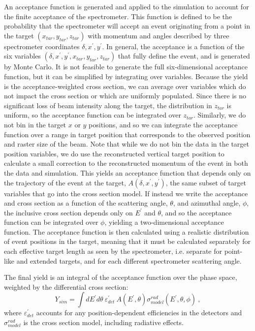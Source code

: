 An acceptance function is generated and applied to the simulation to account
for the finite acceptance of the spectrometer. This function is
defined to be the probability that the spectrometer will accept an event
originating from a point in the target $(x_{tar},y_{tar}, z_{tar})$ with
momentum and angles described by three spectrometer coordinates $\delta,x^{'},
y^{'}$. In general, the acceptance is a function of the six variables
$(\delta, x^{'}, y^{'}, x_{tar}, y_{tar}, z_{tar})$ that fully define the
event, and is generated by Monte Carlo. It is not feasible to generate the
full six-dimensional acceptance function, but it can be simplified by
integrating over variables.  Because the yield is the acceptance-weighted
cross section, we can average over variables which do not impact the cross
section or which are uniformly populated. Since there is no significant loss
of beam intensity along the target, the distribution in $z_{tar}$ is uniform,
so the acceptance function can be integrated over $z_{tar}$. Similarly, we do
not bin in the target $x$ or $y$ positions, and so we can integrate the
acceptance function over a range in target position that corresponds to the
observed position and raster size of the beam. Note that while we do not bin
the data in the target position variables, we do use the reconstructed
vertical target position to calculate a small correction to the reconstructed
momentum of the event in both the data and simulation. This yields an
acceptance function that depends only on the trajectory of the event at the
target, $A(\delta, x^\prime, y^\prime)$, the same subset of target variables
that go into the cross section model. If instead we write the acceptance and
cross section as a function of the scattering angle, $\theta$, and azimuthal
angle, $\phi$, the inclusive cross section depends only on $E^\prime$ and
$\theta$, and so the acceptance function can be integrated over $\phi$,
yielding a two-dimensional acceptance function. The acceptance function is
then calculated using a realistic distribution of event positions in the
target, meaning that it must be calculated separately for each effective
target length as seen by the spectrometer, i.e. separate for point-like and
extended targets, and for each different spectrometer scattering angle.


The final yield is an integral of the acceptance function over the
phase space, weighted by the differential cross section:
%
%
\begin{equation}
 Y_{sim} = \int dE^{\prime} d\theta ~ \varepsilon^{\prime}_{det} ~
 A(E^{\prime},\theta) {}\sigma^{rad}_{model}(E^{\prime},\theta,\phi) ~,
\label{simy.eq}
\end{equation}
%
where $\varepsilon^{\prime}_{det}$ accounts for any position-dependent
efficiencies in the detectors and $\sigma^{rad}_{model}$ is the cross section
model, including radiative effects. 

